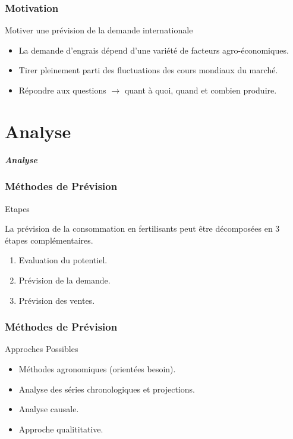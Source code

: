 \documentclass{beamer}
\begin{document}
\begin{frame}
  \frametitle{Motivation}
  \begin{block}{Motiver une prévision de la demande internationale}
    \begin{itemize}
    \item La demande d'engrais dépend d'une variété de facteurs agro-économiques.
    \item Tirer pleinement parti des fluctuations des cours mondiaux du marché. %
    \item  Répondre aux questions $\rightarrow$ quant à quoi, quand et combien produire.
    \end{itemize}
    \end{block}
\end{frame}

\section{Analyse}

\begin{frame}
	\begin{center}
		\Huge \textbf{\textit{Analyse}}
	\end{center}
\end{frame}

\begin{frame}
  \frametitle{Méthodes de Prévision}
  \begin{block}{Etapes}
  \small{La prévision de la consommation en fertilisants peut être décomposées en 3 étapes complémentaires.
  \begin{enumerate}
  \item Evaluation du potentiel.
  \item Prévision de la demande.
  \item Prévision des ventes.
  \end{enumerate}
  }\end{block}
\end{frame}
\begin{frame}
  \frametitle{Méthodes de Prévision}
	\begin{block}{Approches Possibles}
	\small{
	\begin{itemize}
	\item Méthodes agronomiques (orientées besoin).
	\item Analyse des séries chronologiques et projections.
	\item Analyse causale.
	\item Approche qualititative.
	\end{itemize}
	}
	\end{block}
\end{frame}
\end{document}
